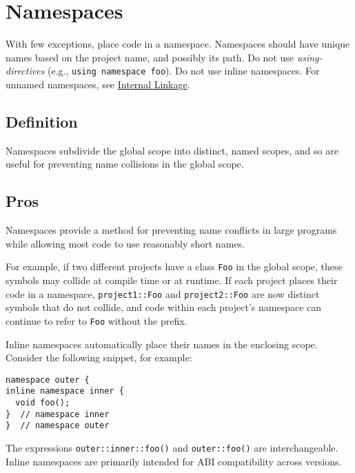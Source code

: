 
\section{Namespaces}\label{sec:namespaces}
With few exceptions, place code in a namespace. Namespaces should have unique names based on the project name, and possibly its path. Do not use \emph{using-directives} (e.g., \texttt{using namespace foo}). Do not use inline namespaces. For unnamed namespaces, see \hyperref[sec:internal-linkage]{Internal Linkage}.

\subsection{Definition}
Namespaces subdivide the global scope into distinct, named scopes, and so are useful for preventing name collisions in the global scope.

\subsection{Pros}
Namespaces provide a method for preventing name conflicts in large programs while allowing most code to use reasonably short names.

For example, if two different projects have a class \texttt{Foo} in the global scope, these symbols may collide at compile time or at runtime. If each project places their code in a namespace, \texttt{project1::Foo} and \texttt{project2::Foo} are now distinct symbols that do not collide, and code within each project's namespace can continue to refer to \texttt{Foo} without the prefix.

Inline namespaces automatically place their names in the enclosing scope. Consider the following snippet, for example:
\begin{verbatim}
namespace outer {
inline namespace inner {
  void foo();
}  // namespace inner
}  // namespace outer
\end{verbatim}

The expressions \texttt{outer::inner::foo()} and \texttt{outer::foo()} are interchangeable. Inline namespaces are primarily intended for ABI compatibility across versions.

